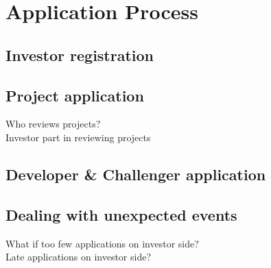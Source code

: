 \section{Application Process}

\subsection{Investor registration}

\subsection{Project application}
Who reviews projects?\\
Investor part in reviewing projects\\

\subsection{Developer \& Challenger application}

\subsection{Dealing with unexpected events}
What if too few applications on investor side?\\
Late applications on investor side?\\

